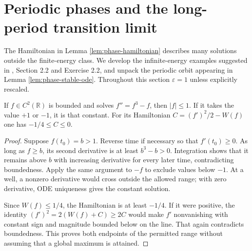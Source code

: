 \chapter{Periodic phases and the long-period transition limit}\label{sec:examples-phase-periodic}
The Hamiltonian in Lemma \ref{lem:phase-hamiltonian} describes many solutions outside the finite-energy class. We develop the infinite-energy examples suggested in \cite{ChAC}, Section 2.2 and Exercise 2.2, and unpack the periodic orbit appearing in Lemma \ref{lem:phase-stable-ode}. Throughout this section $\varepsilon=1$ unless explicitly rescaled.

\begin{proposition}\label{prop:phase-bounded-ode-range}
If $f\in C^2(\mathbb R)$ is bounded and solves $f''=f^3-f$, then $|f|\leq1$. If it takes the value $+1$ or $-1$, it is that constant. For its Hamiltonian $C=(f')^2/2-W(f)$ one has $-1/4\leq C\leq0$.
\end{proposition}
\begin{proof}
Suppose $f(t_0)=b>1$. Reverse time if necessary so that $f'(t_0)\geq0$. As long as $f\geq b$, its second derivative is at least $b^3-b>0$. Integration shows that it remains above $b$ with increasing derivative for every later time, contradicting boundedness. Apply the same argument to $-f$ to exclude values below $-1$. At a well, a nonzero derivative would cross outside the allowed range; with zero derivative, ODE uniqueness gives the constant solution.

Since $W(f)\leq1/4$, the Hamiltonian is at least $-1/4$. If it were positive, the identity $(f')^2=2(W(f)+C)\geq2C$ would make $f'$ nonvanishing with constant sign and magnitude bounded below on the line. That again contradicts boundedness. This proves both endpoints of the permitted range without assuming that a global maximum is attained.
\end{proof}

